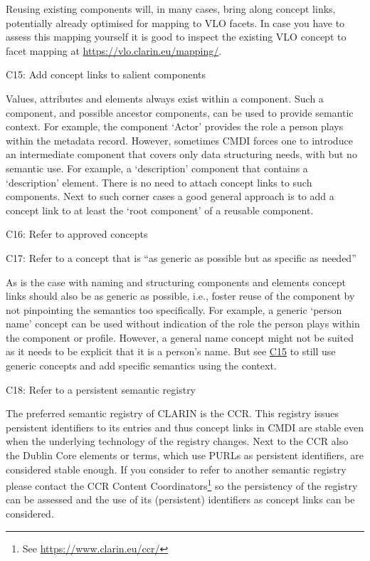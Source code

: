 Reusing existing components will, in many cases, bring along concept links, potentially already optimised for mapping to VLO facets. In case you have to assess this mapping yourself it is good to inspect the existing VLO concept to facet mapping at \url{https://vlo.clarin.eu/mapping/}.

\label{c15}
C15: Add concept links to salient components

 

Values, attributes and elements always exist within a component. Such a component, and possible ancestor components, can be used to provide semantic context. For example, the component `Actor' provides the role a person plays within the metadata record. However, sometimes CMDI forces one to introduce an intermediate component that covers only data
structuring needs, with but no semantic use. For example, a
`description' component that contains a `description' element. There is no need to attach concept links to such components. Next to such corner cases a good general approach is to add a concept link to at least the `root component' of a reusable component.

\begin{workinprogress}
C16: Refer to approved concepts
 
\end{workinprogress}

C17: Refer to a concept that is ``as generic as possible but as specific as needed''


As is the case with naming and structuring components and elements concept links should also be as generic as possible, i.e., foster reuse of the component by not pinpointing the semantics too specifically. For example, a generic `person name' concept can be used without indication of the role the person plays within the component or profile. However, a general name concept might not be suited as it needs to be explicit that it is a person's name. But see \hyperref[c15]{C15} to still use generic concepts and add specific semantics using the context.

C18: Refer to a persistent semantic registry

 

The preferred semantic registry of CLARIN is the CCR. This registry issues persistent identifiers to its entries and thus concept links in CMDI are stable even when the underlying technology of the registry changes. Next to the CCR also the Dublin Core elements or terms, which use PURLs as persistent identifiers, are considered stable enough. If you consider to refer to another semantic registry please contact the
CCR Content Coordinators\footnote{See \url{https://www.clarin.eu/ccr/}} so the persistency of the registry can be assessed and the use of its (persistent) identifiers as concept links can be considered.


